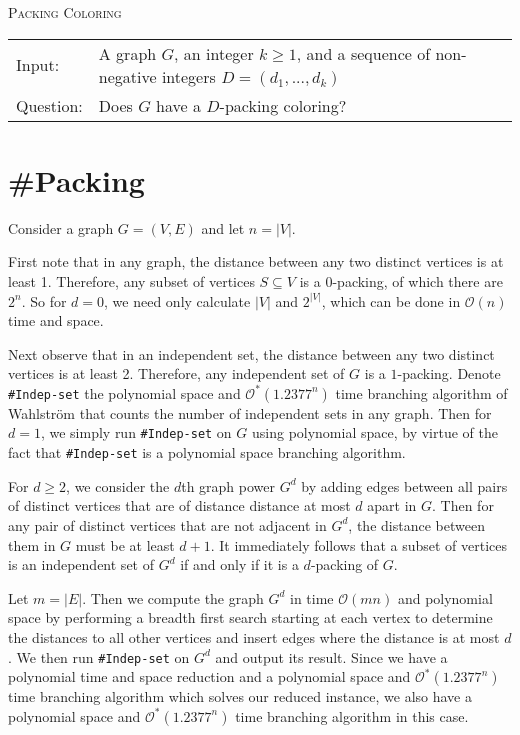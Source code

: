 \documentclass[12pt, a4paper]{article}
\theoremstyle{definition}
\newcommand{\mcO}{\mathcal{O}}
\newcommand{\n}{\\}
\begin{document}
\begin{algorithm}[H]
\textsc{Packing Coloring\n}
\begin{tabular}{l l}
 Input:    & A graph $G$, an integer $k \geq 1$, and a sequence of non-negative integers $D = (d_1,...,d_k)$ \n
 Question: & Does $G$ have a $D$-packing coloring? \n
\end{tabular}	
\end{algorithm}

\clearpage

\section{\#\sc Packing}


Consider a graph $G = (V, E)$ and let $n = |V|$.

First note that in any graph, the distance between any two distinct vertices is at least 1. Therefore, any subset of vertices $S \subseteq V$ is a $0$-packing, of which there are $2^n$. So for $d=0$, we need only calculate $|V|$ and $2^{|V|}$, which can be done in $\mcO(n)$ time and space.

Next observe that in an independent set, the distance between any two distinct vertices is at least 2. Therefore, any independent set of $G$ is a $1$-packing. Denote \texttt{\#Indep-set} the polynomial space and $\mcO^*(1.2377^n)$ time branching algorithm of Wahlstr\"{o}m \cite{Dahllof2005,Wahlstr2008} that counts the number of independent sets in any graph. Then for $d=1$, we simply run \texttt{\#Indep-set} on $G$ using polynomial space, by virtue of the fact that \texttt{\#Indep-set} is a polynomial space branching algorithm.

For $d \geq 2$, we consider the $d$th graph power $G^d$ by adding edges between all pairs of distinct vertices that are of distance distance at most $d$ apart in $G$. Then for any pair of distinct vertices that are not adjacent in $G^d$, the distance between them in $G$ must be at least $d+1$. It immediately follows that a subset of vertices is an independent set of $G^d$ if and only if it is a $d$-packing of $G$.

Let $m=|E|$. Then we compute the graph $G^d$ in time $\mcO(mn)$ and polynomial space by performing a breadth first search starting at each vertex to determine the distances to all other vertices and insert edges where the distance is at most $d$. We then run \texttt{\#Indep-set} on $G^d$ and output its result. Since we have a polynomial time and space reduction and a polynomial space and $\mcO^*(1.2377^n)$ time branching algorithm which solves our reduced instance, we also have a polynomial space and $\mcO^*(1.2377^n)$ time branching algorithm in this case.
\end{document}
